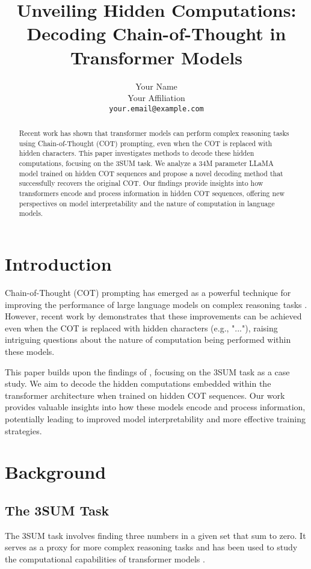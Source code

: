 \documentclass[11pt,a4paper]{article}
\title{Unveiling Hidden Computations: Decoding Chain-of-Thought in Transformer Models}
\author{Your Name\\
Your Affiliation\\
\texttt{your.email@example.com}}
\begin{document}
\maketitle

\begin{abstract}
Recent work has shown that transformer models can perform complex reasoning tasks using Chain-of-Thought (COT) prompting, even when the COT is replaced with hidden characters. This paper investigates methods to decode these hidden computations, focusing on the 3SUM task. We analyze a 34M parameter LLaMA model trained on hidden COT sequences and propose a novel decoding method that successfully recovers the original COT. Our findings provide insights into how transformers encode and process information in hidden COT sequences, offering new perspectives on model interpretability and the nature of computation in language models.
\end{abstract}

\section{Introduction}
Chain-of-Thought (COT) prompting has emerged as a powerful technique for improving the performance of large language models on complex reasoning tasks \citep{wei2022chain}. However, recent work by \citet{pfau2024let} demonstrates that these improvements can be achieved even when the COT is replaced with hidden characters (e.g., "..."), raising intriguing questions about the nature of computation being performed within these models.

This paper builds upon the findings of \citet{pfau2024let}, focusing on the 3SUM task as a case study. We aim to decode the hidden computations embedded within the transformer architecture when trained on hidden COT sequences. Our work provides valuable insights into how these models encode and process information, potentially leading to improved model interpretability and more effective training strategies.

\section{Background}
\subsection{The 3SUM Task}
The 3SUM task involves finding three numbers in a given set that sum to zero. It serves as a proxy for more complex reasoning tasks and has been used to study the computational capabilities of transformer models \citep{pfau2024let}.
\end{document}
